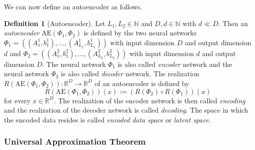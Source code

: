 \documentclass[11pt,titlepage]{article}
\newcommand{\R}{\mathbb{R}} %
\newcommand{\N}{\mathbb{N}} %
\theoremstyle{definition}
\newtheorem{definition}[theorem]{Definition}
\theoremstyle{remark}
\begin{document}
	We can now define an autoencoder as follows.
	
	\begin{definition}[Autoencoder]\label{Def autoencoder}
		Let $L_1,L_2\in\N$ and $D,d\in\N$ with $d\ll D$. Then an \textsl{autoencoder} $\mathrm{AE}(\Phi_1,\Phi_2)$ is defined by the two neural networks $\Phi_1 = ((A_1^1, b_1^1),\ldots,(A_{L_1}^1, b_{L_1}^1))$ with input dimension $D$ and output dimension 
		$d$ and 
		$\Phi_2 = ((A_1^2, b_1^2),\ldots,(A_{L_2}^2, b_{L_2}^2))$ with input dimension $d$ 
		and output dimension $D$. 
		The neural network $\Phi_1$ is also called \textsl{encoder} network and the 
		neural network $\Phi_2$ is also called \textsl{decoder} network. 
		The realization $R(\mathrm{AE}(\Phi_1, \Phi_2)) : \R^D\to \R^D$ of an
		autoencoder is defined by
		\[R(\mathrm{AE}(\Phi_1, \Phi_2))(x) := (R(\Phi_2)\circ R(\Phi_1))(x)\]
		for every $x\in\R^D$. The realization of the encoder network is then called \textsl{encoding} and the realization of the decoder network is called \textsl{decoding}. The space in which the encoded data resides is called \textsl{encoded data space} or \textsl{latent space}.
	\end{definition}
	
	\subsubsection{Universal Approximation Theorem}
	
\end{document}
